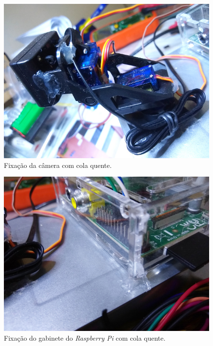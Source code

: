\begin{apendicesenv}
\begin{figure}[H]
	\centering
	\includegraphics[width=1\linewidth]{figuras/vista_detalhe_fixacao_camera}
	\caption{Fixação da câmera com cola quente.}
	\label{fig:vistadetalhefixacaocamera}
\end{figure}

\begin{figure}[H]
	\centering
	\includegraphics[width=1\linewidth]{figuras/vista_detalhe_fixacao_raspi}
	\caption{Fixação do gabinete do \textit{Raspberry Pi} com cola quente.}
	\label{fig:vistadetalhefixacaoraspi}
\end{figure}


\end{apendicesenv}
